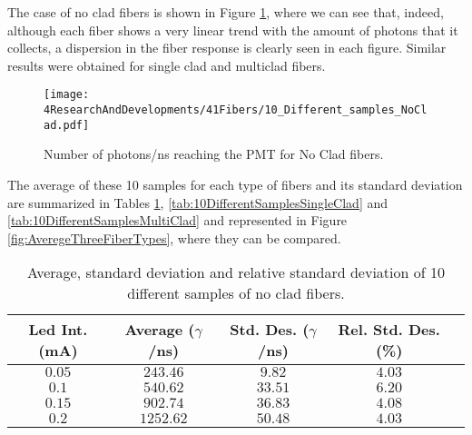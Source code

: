 The case of no clad fibers is shown in Figure \ref{fig:10samplesNC}, where we can see that, indeed, although each fiber shows a very linear trend with the amount of photons that it collects, a dispersion in the fiber response is clearly seen in each figure. Similar results were obtained for single clad and multiclad fibers.



\begin{figure}[h]
\centering
\texttt{[image: 4ResearchAndDevelopments/41Fibers/10\_Different\_samples\_NoClad.pdf]}
\caption{Number of photons/ns reaching the PMT for No Clad fibers.\label{fig:10samplesNC}}
\end{figure}

The average of these 10 samples for each type of fibers and its standard deviation are summarized in Tables \ref{tab:10DifferentSamplesNoClad}, \ref{tab:10DifferentSamplesSingleClad} and \ref{tab:10DifferentSamplesMultiClad} and represented in Figure \ref{fig:AveregeThreeFiberTypes}, where they can be compared. 

\begin{table}[htbp]
\begin{center}
\begin{tabular}{|c|c|c|c|c|}
\hline
Led Int. (mA) & Average ($\gamma$/ns) & Std. Des. ($\gamma$/ns) & Rel. Std. Des. (\%)\\
\hline \hline \hline
$0.05$ & $243.46$ & $9.82$ & $4.03$ \\ \hline
$0.1$ & $540.62$ & $33.51$ & $6.20$ \\ \hline
$0.15$ & $902.74$ & $36.83$ & $4.08$ \\ \hline
$0.2$ & $1252.62$ & $50.48$ & $4.03$ \\ \hline
\end{tabular}
\caption{Average, standard deviation and relative standard deviation of 10 different samples of no clad fibers.}
\label{tab:10DifferentSamplesNoClad}
\end{center}
\end{table}

